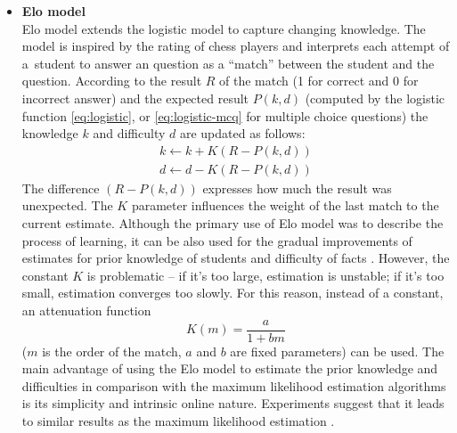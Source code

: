 \documentclass[12pt, twoside]{fithesis2}
\renewcommand{\_}{\leavevmode \kern0.07em\vbox{\hrule width0.4em}}
\newcommand{\squarebullet}{\textcolor{black}{\raisebox{0.15em}{\rule{4pt}{4pt}}}}
\newcommand{\emptysquarebullet}{\textcolor{black}{\raisebox{0.10em}{\tiny$\square$}}}
\newenvironment{myItemize}{
  \begin{itemize}[leftmargin=2em,rightmargin=1em,itemsep=\parskip ,parsep=0em,topsep=0em,partopsep=0em]
  \renewcommand{\labelitemi}{\squarebullet}
  \renewcommand{\labelitemii}{\textbullet}
}{
  \end{itemize}
}
\newcounter{choice}
\begin{document}
\begin{myItemize}
\item \textbf{Elo model}\\
  Elo model extends the logistic model to capture changing knowledge.
  The model is inspired by the rating of chess players \cite{elo-rating} and interprets each attempt of a~student to answer an question as a ``match'' between the student and the question.
  According to the result $R$ of the match (1 for correct and 0 for incorrect answer)
  and the expected result $P(k, d)$
  (computed by the logistic function \ref{eq:logistic}, or \ref{eq:logistic-mcq} for multiple choice questions)
  the knowledge $k$ and difficulty $d$ are updated as follows:
  \begin{equation}\label{eq:elo}
  \begin{array}{l}
      k \gets k + K (R - P(k, d))\\
      d \gets d - K (R - P(k, d))
  \end{array}
  \end{equation}
The difference $(R - P(k, d))$ expresses how much the result was unexpected.
The $K$ parameter influences the weight of the last match to the current estimate.
Although the primary use of Elo model was to describe the process of learning,
it can be also used for the gradual improvements of estimates for prior knowledge of students and difficulty of facts \cite{slepe-mapy}.
However, the constant $K$ is problematic -- if it's too large, estimation is unstable; if it's too small, estimation converges too slowly.
For this reason, instead of a constant, an attenuation function
\begin{equation}\label{eq:attenuation}
  K(m) = \frac{a}{1 + bm}
\end{equation}
($m$ is the order of the match, $a$ and $b$ are fixed parameters) can be used.
The main advantage of using the Elo model to estimate the prior knowledge and difficulties in comparison with the maximum likelihood estimation algorithms is its simplicity and intrinsic online nature.
Experiments suggest that it leads to similar results as the maximum likelihood estimation \cite{slepe-mapy-time-elo}.


\end{myItemize}
\end{document}
